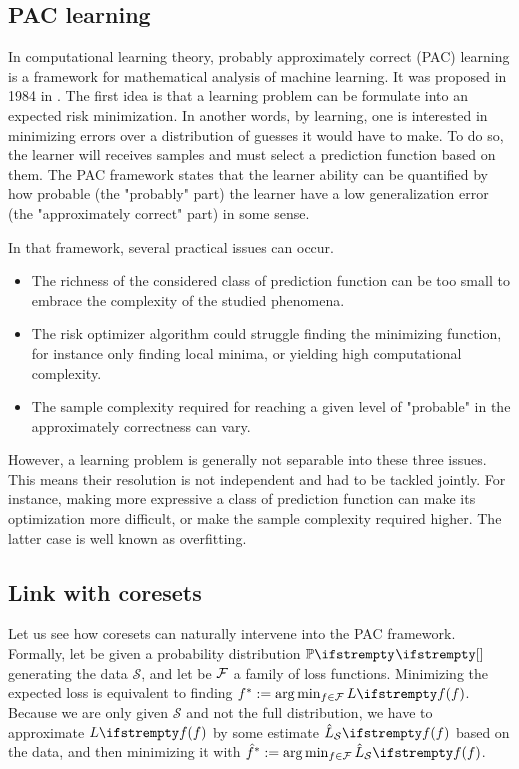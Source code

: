 \subsection{PAC learning}In computational learning theory, probably approximately correct (PAC) learning is a framework for mathematical analysis of machine learning. It was proposed in 1984 in \cite{valiant1984learnable}. The first idea is that a learning problem can be formulate into an expected risk minimization. In another words, by learning, one is interested in minimizing errors over a distribution of guesses it would have to make. To do so, the learner will receives samples and must select a prediction function based on them. The PAC framework states that the learner ability can be quantified by how probable (the "probably" part) the learner have a low generalization error (the "approximately correct" part) in some sense.



In that framework, several practical issues can occur. 
\begin{itemize}
    \item The richness of the considered class of prediction function can be too small to embrace the complexity of the studied phenomena.
    \item The risk optimizer algorithm could struggle finding the minimizing function, for instance only finding local minima, or yielding high computational complexity.
    \item The sample complexity required for reaching a given level of "probable" in the approximately correctness can vary.
\end{itemize}

However, a learning problem is generally not separable into these three issues. This means their resolution is not independent and had to be tackled jointly. For instance, making more expressive a class of prediction function can make its optimization more difficult, or make the sample complexity required higher. The latter case is well known as overfitting.

\subsection{Link with coresets}

Let us see how coresets can naturally intervene into the PAC framework. Formally, let be given a probability distribution $\PP{}{}$ generating the data $\mathcal{S}$, and let be $\mathcal{F}$ a family of loss functions. Minimizing the expected loss is equivalent to finding $\query^*:= \arg \min_{\query \in \qset} \loss{\query}$. Because we are only given $\mathcal{S}$ and not the full distribution, we have to approximate $\loss{\query}$ by some estimate $\estloss{\mathcal{S}}{\query}$ based on the data, and then minimizing it with $\hat{\query}^* := \arg \min_{\query\in \qset} \estloss{\mathcal{S}}{\query}$. 


